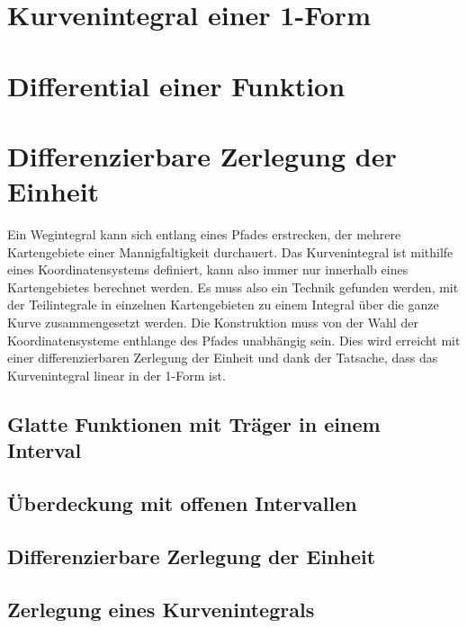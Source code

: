 %
%
\section{Kurvenintegral einer 1-Form}


%
%
\section{Differential einer Funktion}

%
%
\section{Differenzierbare Zerlegung der Einheit}
Ein Wegintegral kann sich entlang eines Pfades erstrecken, der
mehrere Kartengebiete einer Mannigfaltigkeit durchauert.
Das Kurvenintegral ist mithilfe eines Koordinatensystems definiert,
kann also immer nur innerhalb eines Kartengebietes berechnet werden.
Es muss also ein Technik gefunden werden, mit der Teilintegrale in
einzelnen Kartengebieten zu einem Integral über die ganze Kurve
zusammengesetzt werden.
Die Konstruktion muss von der Wahl der Koordinatensysteme enthlange
des Pfades unabhängig sein.
Dies wird erreicht mit einer differenzierbaren Zerlegung der Einheit
und dank der Tatsache, dass das Kurvenintegral linear in der 1-Form
ist.

\subsection{Glatte Funktionen mit Träger in einem Interval}

\subsection{Überdeckung mit offenen Intervallen}

\subsection{Differenzierbare Zerlegung der Einheit}

\subsection{Zerlegung eines Kurvenintegrals}


